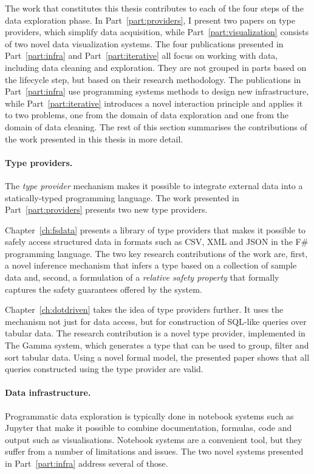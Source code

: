 \documentclass[fleqn,11pt]{report}
\theoremstyle{definition}
\begin{document}
The work that constitutes this thesis contributes to each of the four steps of the data
exploration phase. In Part~\ref{part:providers}, I present two papers on type providers,
which simplify data acquisition, while Part~\ref{part:visualization} consists of two
novel data visualization systems. The four publications presented in Part~\ref{part:infra}
and Part~\ref{part:iterative} all focus on working with data, including data cleaning and
exploration. They are not grouped in parts based on the lifecycle step, but based on their research
methodology. The publications in Part~\ref{part:infra} use programming systems methods to
design new infrastructure, while Part~\ref{part:iterative} introduces a novel interaction
principle and applies it to two problems, one from the domain of data exploration and one from the
domain of data cleaning. The rest of this section summarises the contributions of the work
presented in this thesis in more detail.

\paragraph{Type providers.}
The \emph{type provider} mechanism \citep{syme-2012-providers,syme-2013-inforich} makes it possible
to integrate external data into a statically-typed programming language. The work presented in
Part~\ref{part:providers} presents two new type providers.

Chapter~\ref{ch:fsdata} presents a library of type providers that makes it possible to safely access
structured data in formats such as CSV, XML and JSON in the F\# programming language. The two key
research contributions of the work are, first, a novel inference mechanism that infers a type based
on a collection of sample data and, second, a formulation of a \emph{relative safety property} that
formally captures the safety guarantees offered by the system.

Chapter~\ref{ch:dotdriven} takes the idea of type providers further. It uses the mechanism not just
for data access, but for construction of SQL-like queries over tabular data. The research
contribution is a novel type provider, implemented in The Gamma system, which generates a type that
can be used to group, filter and sort tabular data. Using a novel formal model, the presented paper
shows that all queries constructed using the type provider are valid.

\paragraph{Data infrastructure.}
Programmatic data exploration is typically done in notebook systems such as Jupyter
\citep{kluyver-2016-jupyter} that make it possible to combine documentation, formulas, code and
output such as visualisations. Notebook systems are a convenient tool, but they suffer from
a number of limitations and issues. The two novel systems presented in Part~\ref{part:infra} address
several of those.
\end{document}
